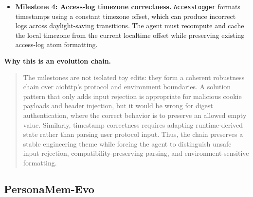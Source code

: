 \documentclass{llmxive}
\begin{document}
\begin{tcolorbox}
\begin{itemize}[leftmargin=1.5em]
      \item \textbf{Milestone 4: Access-log timezone correctness.}
      \texttt{AccessLogger} formats timestamps using a constant timezone offset, which can produce incorrect logs across
daylight-saving transitions. The agent must recompute and cache the local timezone from the current localtime offset while
preserving existing access-log atom formatting.
  \end{itemize}

  \vspace{0.5em}
  \textbf{Why this is an evolution chain.}
  \begin{quote}
  The milestones are not isolated toy edits: they form a coherent robustness chain over aiohttp's protocol and environment
boundaries. A solution pattern that only adds input rejection is appropriate for malicious cookie payloads and header injection,
but it would be wrong for digest authentication, where the correct behavior is to preserve an allowed empty value. Similarly,
timestamp correctness requires adapting runtime-derived state rather than parsing user protocol input. Thus, the chain preserves
a stable engineering theme while forcing the agent to distinguish unsafe input rejection, compatibility-preserving parsing, and
environment-sensitive formatting.
  \end{quote}

  \end{tcolorbox}

\subsection{PersonaMem-Evo}
\end{document}
